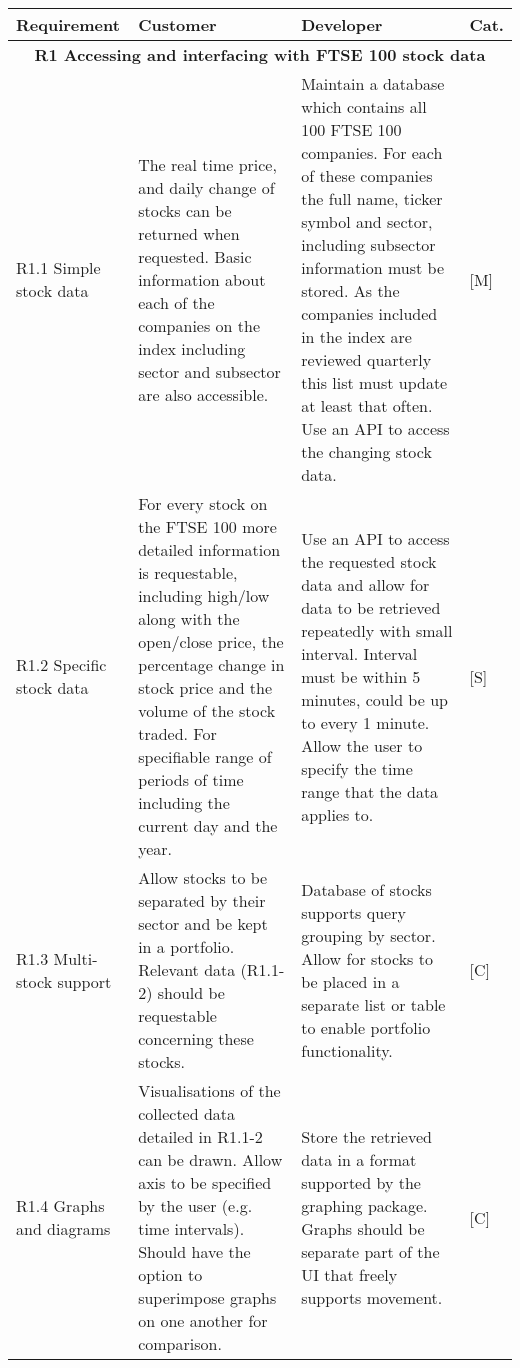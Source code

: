 \documentclass[9pt]{article} %
\begin{document}
	\begin{center}
	\begin{longtable}{ | m{3cm} | m{7cm} | m{7cm} | m{0.5cm} | } 
		\hline
		Requirement & Customer & Developer & Cat. \\
		\hline
		\multicolumn{4}{|c|}{\textbf{R1 Accessing and interfacing with FTSE 100 stock data}} \\
		\hline
		
		R1.1 Simple stock data & 
		The real time price, and daily change of stocks can be returned when requested. Basic information about each of the companies on the index including sector and subsector are also accessible. & 
		Maintain a database which contains all 100 FTSE 100 companies. For each of these companies the full name, ticker symbol and sector, including subsector information must be stored. As the companies included in the index are reviewed quarterly this list must update at least that often. Use an API to access the changing stock data. & 
		[M] \\ 

		\hline
		
		R1.2 Specific stock data & 
		For every stock on the FTSE 100 more detailed information is requestable, including high/low along with the open/close price, the percentage change in stock price and the volume of the stock traded. For specifiable range of periods of time including the current day and the year. & 
		Use an API to access the requested stock data and allow for data to be retrieved repeatedly with small interval. Interval must be within 5 minutes, could be up to every 1 minute. Allow the user to specify the time range that the data applies to. & 
		[S] \\
		
		\hline
		
		R1.3 Multi-stock support & 
		Allow stocks to be separated by their sector and be kept in a portfolio. Relevant data (R1.1-2) should be requestable concerning these stocks. & 
		Database of stocks supports query grouping by sector. Allow for stocks to be placed in a separate list or table to enable portfolio functionality. & 
		[C]\\
		
		\hline
		
		R1.4 Graphs and diagrams  & 
		Visualisations of the collected data detailed in R1.1-2 can be drawn. Allow axis to be specified by the user (e.g. time intervals). Should have the option to superimpose graphs on one another for comparison. &
 		Store the retrieved data in a format supported by the graphing package. Graphs should be separate part of the UI that freely supports movement. & 
 		[C] \\
 

\end{longtable}
\end{center}
\end{document}
